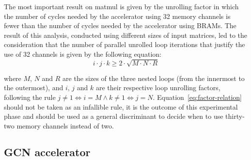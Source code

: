 \documentclass[11pt,a4paper,twocolumn]{article}
\begin{document}
The most important result on matmul is given by the unrolling factor in which the number of cycles needed by the accelerator using 32 memory channels is fewer than the number of cycles needed by the accelerator using BRAMs.
The result of this analysis, conducted using different sizes of input matrices, led to the consideration that the number of parallel unrolled loop iterations that justify the use of 32 channels is given by the following equation:
\begin{equation}
    \label{eq:factor-relation}
        i \cdot j \cdot k \geq 2 \cdot \sqrt {M \cdot N \cdot R}
\end{equation}

where $M$, $N$ and $R$ are the sizes of the three nested loops (from the innermost to the outermost), and $i$, $j$ and $k$ are their respective loop unrolling factors, following the rule $j \neq 1 \iff i=M \land k \neq 1 \iff j=N$.
Equation~\ref{eq:factor-relation} should not be taken as an infallible rule, it is the outcome of this experimental phase and should be used as a general discriminant to decide when to use thirty-two memory channels instead of two.

\subsection{GCN accelerator}
\label{subsec:gcn-accelerator}%

\begin{table}[t]
\centering
    \\[10pt]
    \caption{Cora sub-dataset used for GCN inference}
    \label{tab:dataset-definition}
\end{table}
\end{document}
